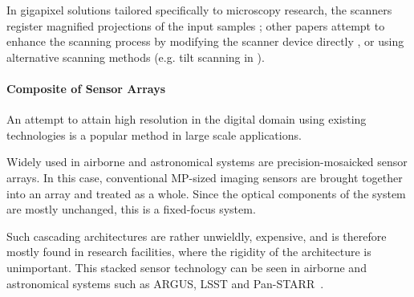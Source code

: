 In gigapixel solutions tailored specifically to microscopy research, the scanners register magnified projections of the input samples \cite{Zheng:12};
other papers attempt to enhance the scanning process by modifying the scanner device directly \cite{ConfocalScan}, or using alternative scanning methods (e.g. tilt scanning in \cite{tileScan}).



\paragraph{Composite of Sensor Arrays}
An attempt to attain high resolution in the digital domain using existing technologies is a popular method in large scale applications. 

Widely used in airborne and astronomical systems are precision-mosaicked sensor arrays. In this case, conventional MP-sized imaging sensors are brought together into an array and treated as a whole. Since the optical components of the system are mostly unchanged, this is a fixed-focus system. %

Such cascading architectures are rather unwieldly, expensive, and is therefore mostly found in research facilities, where the rigidity of the architecture is unimportant. This stacked sensor technology can be seen in airborne and astronomical systems such as ARGUS, LSST and Pan-STARR~\cite{multiscale}.

